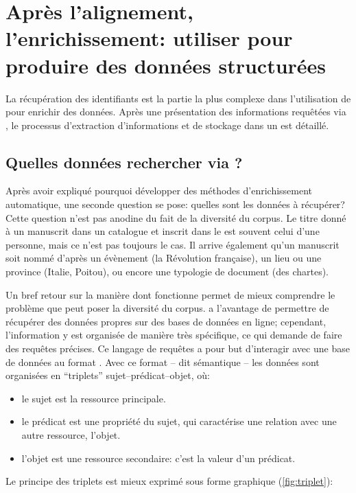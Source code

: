 \section{Après l'alignement, l'enrichissement: utiliser \sparql{} pour produire des données structurées}
La récupération des identifiants \wkd{} est la partie la plus complexe dans l'utilisation de \wkd{} pour enrichir des données. Après une présentation des informations requêtées via \sparql{}, le processus d'extraction d'informations et de stockage dans un \json{} est détaillé.

\subsection{Quelles données rechercher via \sparql?}
Après avoir expliqué pourquoi développer des méthodes d'enrichissement automatique, une seconde question se pose: quelles sont les données à récupérer? Cette question n'est pas anodine du fait de la diversité du corpus. Le titre donné à un manuscrit dans un catalogue et inscrit dans le \tname{} est souvent celui d'une personne, mais ce n'est pas toujours le cas. Il arrive également qu'un manuscrit soit nommé d'après un évènement (la Révolution française), un lieu ou une province (Italie, Poitou), ou encore une typologie de document (des chartes).

Un bref retour sur la manière dont fonctionne \sparql{} permet de mieux comprendre le problème que peut poser la diversité du corpus. \sparql{} a l'avantage de permettre de récupérer des données propres sur des bases de données en ligne; cependant, l'information y est organisée de manière très spécifique, ce qui demande de faire des requêtes précises. Ce langage de requêtes a pour but d'interagir avec une base de données au format \rdf{}. Avec ce format -- dit sémantique -- les données sont organisées en \enquote{triplets} sujet--prédicat--objet, où:

\begin{itemize}
	\item le sujet est la ressource principale.
	\item le prédicat est une propriété du sujet, qui caractérise une relation avec une autre ressource, l'objet.
	\item l'objet est une ressource secondaire: c'est la valeur d'un prédicat.
\end{itemize}

Le principe des triplets \rdf{} est mieux exprimé sous forme graphique (\ref{fig:triplet}):

